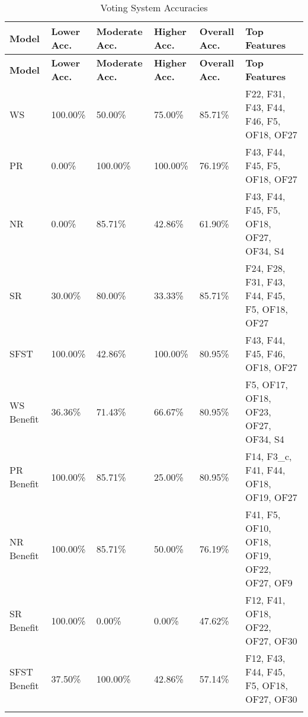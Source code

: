 \begin{longtable}{|p{1.5cm}|p{2.0cm}|p{2.0cm}|p{2.0cm}|p{2.0cm}|p{4cm}|}
\hline
\textbf{Model} & \textbf{Lower Acc.} & \textbf{Moderate Acc.} & \textbf{Higher Acc.} & \textbf{Overall Acc.} & \textbf{Top Features} \\ \hline
\endfirsthead
\hline
\textbf{Model} & \textbf{Lower Acc.} & \textbf{Moderate Acc.} & \textbf{Higher Acc.} & \textbf{Overall Acc.} & \textbf{Top Features} \\ \hline
\endhead

WS & 100.00\% & 50.00\% & 75.00\% & 85.71\% & F22, F31, F43, F44, F46, F5, OF18, OF27 \\ \hline
PR & 0.00\% & 100.00\% & 100.00\% & 76.19\% & F43, F44, F45, F5, OF18, OF27 \\ \hline
NR & 0.00\% & 85.71\% & 42.86\% & 61.90\% & F43, F44, F45, F5, OF18, OF27, OF34, S4 \\ \hline
SR & 30.00\% & 80.00\% & 33.33\% & 85.71\% & F24, F28, F31, F43, F44, F45, F5, OF18, OF27 \\ \hline
SFST & 100.00\% & 42.86\% & 100.00\% & 80.95\% & F43, F44, F45, F46, OF18, OF27 \\ \hline
WS Benefit & 36.36\% & 71.43\% & 66.67\% & 80.95\% & F5, OF17, OF18, OF23, OF27, OF34, S4 \\ \hline
PR Benefit & 100.00\% & 85.71\% & 25.00\% & 80.95\% & F14, F3\_c, F41, F44, OF18, OF19, OF27 \\ \hline
NR Benefit & 100.00\% & 85.71\% & 50.00\% & 76.19\% & F41, F5, OF10, OF18, OF19, OF22, OF27, OF9 \\ \hline
SR Benefit & 100.00\% & 0.00\% & 0.00\% & 47.62\% & F12, F41, OF18, OF22, OF27, OF30 \\ \hline
SFST Benefit & 37.50\% & 100.00\% & 42.86\% & 57.14\% & F12, F43, F44, F45, F5, OF18, OF27, OF30 \\ \hline

\caption{Voting System Accuracies}
\label{tab:grouping_3d}
\end{longtable}
